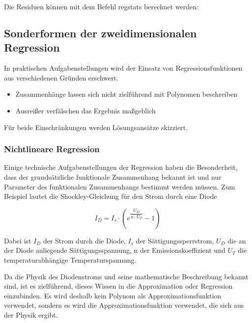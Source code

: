\noindent Die Residuen k\"{o}nnen mit dem Befehl regstats berechnet werden:



\clearpage

\subsection{Sonderformen der zweidimensionalen Regression}

\noindent In praktischen Aufgabenstellungen wird der Einsatz von Regressionsfunktionen aus verschiedenen Gr\"{u}nden erschwert.

\begin{itemize}
    \item Zusammenh\"{a}nge lassen sich nicht zielf\"{u}hrend mit Polynomen beschreiben
    \item  Ausrei{\ss}er verf\"{a}lschen das Ergebnis ma{\ss}geblich
\end{itemize}

\noindent F\"{u}r beide Einschr\"{a}nkungen werden L\"{o}sungsans\"{a}tze skizziert.

\subsubsection{Nichtlineare Regression}

\noindent Einige technische Aufgabenstellungen der Regression haben die Besonderheit, dass der grunds\"{a}tzliche funktionale Zusammenhang bekannt ist und nur Parameter des funktionalen Zusammenhangs bestimmt werden m\"{u}ssen. Zum Beispiel lautet die Shockley-Gleichung f\"{u}r den Strom durch eine Diode

\begin{equation}\label{eq:twelveonehundredthirtyfive}
I_{D} =I_{s} \cdot \left(e^{\dfrac{U_{D}}{n\cdot U_{T}}} -1\right)
\end{equation}

\noindent Dabei ist $I_{D}$ der Strom durch die Diode, $I_{s}$ der S\"{a}ttigungssperrstrom, $U_{D}$ die an der Diode anliegende S\"{a}ttigungsspannung, n der Emissionskoeffizient und $U_{T}$ die temperaturabh\"{a}ngige Temperaturspannung.\newline

\noindent Da die Physik des Diodenstroms und seine mathematische Beschreibung bekannt sind, ist es zielf\"{u}hrend, dieses Wissen in die Approximation oder Regression einzubinden. Es wird deshalb kein Polynom als Approximationsfunktion verwendet, sondern es wird die Approximationsfunktion verwendet, die sich aus der Physik ergibt.\newline

